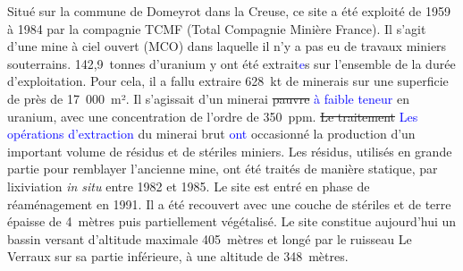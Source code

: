 \documentclass{article}
\newcommand{\blue}[1]{\textcolor{blue}{#1}} %
\begin{document}

Situé sur la commune de Domeyrot dans la Creuse, ce site a été exploité de 1959 à 1984 par la compagnie TCMF (Total Compagnie Minière France). Il s'agit d'une mine à ciel ouvert (MCO) dans laquelle il n'y a pas eu de travaux miniers souterrains. 142,9~tonnes d’uranium y ont été extrait\blue{e}s sur l’ensemble de la durée d’exploitation. Pour cela, il a fallu extraire 628~kt de minerais sur une superficie de près de 17~000~m². Il s'agissait d’un minerai \sout{pauvre} \blue{à faible teneur} en uranium, avec une concentration de l’ordre de 350~ppm. \sout{Le traitement} \blue{Les opérations d'extraction} du minerai brut \blue{ont} occasionné la production d'un important volume de résidus et de stériles miniers. Les résidus, utilisés en grande partie pour remblayer l’ancienne mine, ont été traités de manière statique, par lixiviation \textit{in situ} entre 1982 et 1985. Le site est entré en phase de réaménagement en 1991. Il a été recouvert avec une couche de stériles et de terre épaisse de 4~mètres puis partiellement végétalisé. Le site constitue aujourd'hui un bassin versant d’altitude maximale 405~mètres et longé par le ruisseau Le Verraux sur sa partie inférieure, à une altitude de 348~mètres.
\end{document}
